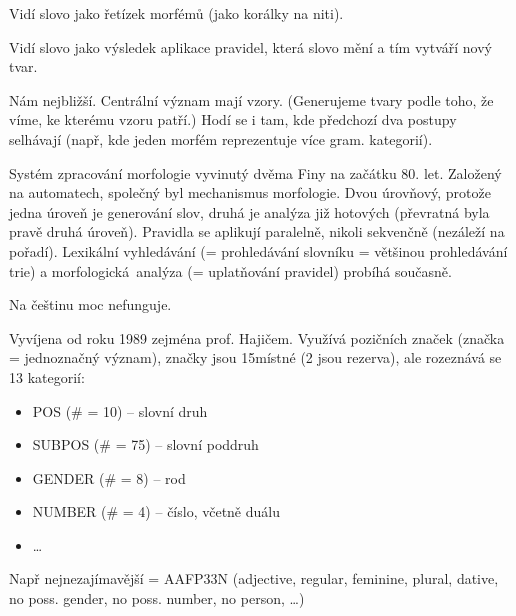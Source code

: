 \documentclass[12pt]{article}					%
\begin{document}
\begin{definice}
	Vidí slovo jako řetízek morfémů (jako korálky na niti).
\end{definice}

\begin{definice}
	Vidí slovo jako výsledek aplikace pravidel, která slovo mění a tím vytváří nový tvar.
\end{definice}

\begin{definice}
	Nám nejbližší. Centrální význam mají vzory. (Generujeme tvary podle toho, že víme, ke kterému vzoru patří.) Hodí se i tam, kde předchozí dva postupy selhávají (např, kde jeden morfém reprezentuje více gram. kategorií).
\end{definice}

\begin{definice}
	Systém zpracování morfologie vyvinutý dvěma Finy na začátku 80. let. Založený na automatech, společný byl mechanismus morfologie. Dvou úrovňový, protože jedna úroveň je generování slov, druhá je analýza již hotových (převratná byla pravě druhá úroveň). Pravidla se aplikují paralelně, nikoli sekvenčně (nezáleží na pořadí). Lexikální vyhledávání (= prohledávání slovníku = většinou prohledávání trie) a morfologická analýza (= uplatňování pravidel) probíhá současně.

	Na češtinu moc nefunguje. 
\end{definice}

\begin{definice}
	Vyvíjena od roku 1989 zejména prof. Hajičem. Využívá pozičních značek (značka = jednoznačný význam), značky jsou 15místné (2 jsou rezerva), ale rozeznává se 13 kategorií:
	\begin{itemize}
		\item POS (\# = 10) – slovní druh
		\item SUBPOS (\# = 75) – slovní poddruh
		\item GENDER (\# = 8) – rod
		\item NUMBER (\# = 4) – číslo, včetně duálu
		\item …
	\end{itemize}

	Např nejnezajímavější = AAFP3\-\-\-\-3N\-\-\-\- (adjective, regular, feminine, plural, dative, no poss. gender, no poss. number, no person, …)
\end{definice}
\end{document}
